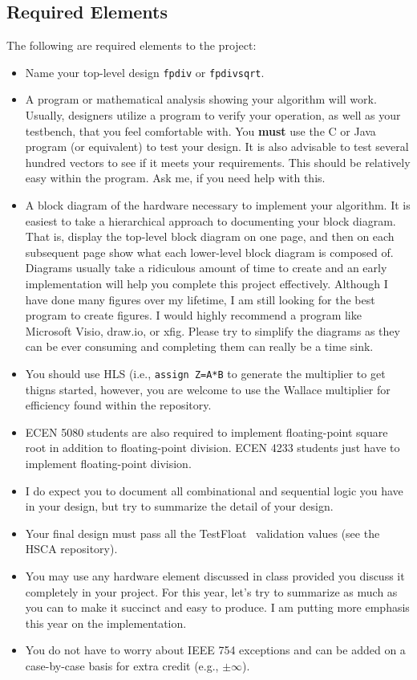 \documentclass[times, 10pt, twocolumn]{IEEEtran}
\begin{document}
\subsection{Required Elements}

The following are required elements to the project:
\begin{itemize}
\item Name your top-level design \verb!fpdiv! or \verb!fpdivsqrt!.
\item A program or mathematical analysis showing your algorithm will
  work.  Usually, designers utilize a program to verify your
  operation, as well as your testbench, that
  you feel comfortable with.  You {\bf must} use the C or Java program
  (or equivalent) to test your design.  It is also advisable to test
  several hundred vectors to see if it meets your requirements.  This
  should be relatively easy within the program.  Ask me, if you need
  help with this.  
\item A block diagram of the hardware necessary to implement your algorithm.
  It is easiest to take a hierarchical approach to documenting your block
  diagram.   That is, display the top-level block diagram on one page, and
  then on each subsequent page show what each lower-level block diagram is
  composed of.  Diagrams usually take a ridiculous amount of time to create
  and an early implementation will help you complete this project effectively.
  Although I have done many figures over my lifetime, I am still looking for
  the best program to create figures.  I would highly recommend a program
  like Microsoft Visio, draw.io, or xfig.  Please try to simplify the
  diagrams as they can be ever consuming and completing them can
  really be a time sink.
\item You should use
  HLS (i.e., \verb!assign Z=A*B!
  to generate the multiplier to get thigns started, however, you are welcome to use the
  Wallace multiplier for efficiency found within the repository.
\item ECEN 5080 students are also required to implement floating-point
  square root in addition to floating-point division.
  ECEN 4233 students just have to implement floating-point
  division.  
\item I do expect you to document all combinational and sequential logic you
  have in your design, but try to summarize the detail of your
  design.
\item Your final design must pass all the TestFloat~\cite{hauser}
  validation values (see the HSCA repository).
\item You may use any hardware element discussed in class provided you
  discuss it completely in your project.  For this year, let's try to
  summarize as much as you can to make it succinct and easy to
  produce.  I am putting more emphasis this year on the
  implementation.
\item You do not have to worry about IEEE 754 exceptions and can be
  added on a case-by-case basis for extra credit (e.g., $\pm\infty$).  
\end{itemize}
\end{document}
